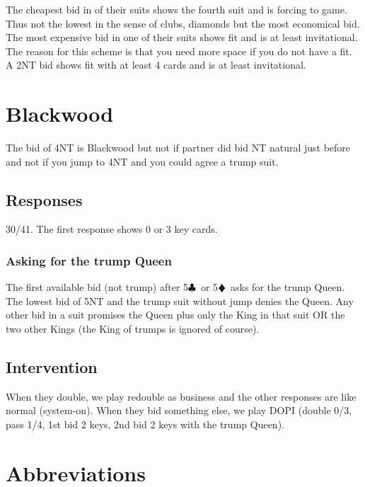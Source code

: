 \documentclass[a4paper]{article}
\newcommand{\BC}{\textcolor{OliveGreen}{$\clubsuit$}}
\newcommand{\BD}{\textcolor{RedOrange}{$\vardiamondsuit$}}
\begin{document}
The cheapest bid in of their suits shows the fourth suit and is forcing to
game. Thus not the lowest in the sense of clubs, diamonds but the most
economical bid. The most expensive bid in one of their suits shows fit and is
at least invitational. The reason for this scheme is that you need more space
if you do not have a fit. A 2NT bid shows fit with at least 4 cards and is at
least invitational.
\bigbreak
\section{Blackwood}

The bid of 4NT is Blackwood but not if partner did bid NT natural just before and not if you jump to 4NT and you could agree a trump suit.
\bigbreak
\subsection{Responses}

30/41. The first response shows 0 or 3 key cards.
\bigbreak
\subsubsection{Asking for the trump Queen}

The first available bid (not trump) after 5\BC\ or 5\BD\ asks for the trump Queen.
\bigbreak
The lowest bid of 5NT and the trump suit without jump denies the Queen. Any other
bid in a suit promises the Queen plus only the King in that suit OR the two
other Kings (the King of trumps is ignored of course).
\bigbreak
\subsection{Intervention}

When they double, we play redouble as business and the other responses are like normal (system-on).
When they bid something else, we play DOPI (double 0/3, pass 1/4, 1st bid 2 keys, 2nd bid 2 keys with the trump Queen).
\bigbreak
\section{Abbreviations}
\end{document}
